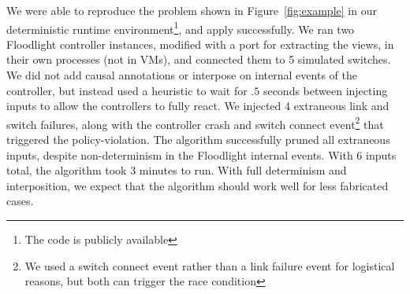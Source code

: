 
We were able to reproduce the problem shown in Figure~\ref{fig:example} in our
deterministic runtime environment\footnote{The code is publicly available}, and apply \simulator{} successfully.
We ran two Floodlight controller instances, modified with a port for
extracting the views, in their own processes (not in
VMs), and connected them to 5 simulated switches. We did not add causal
annotations or interpose on internal events of the controller, but instead used a
heuristic to wait for $.5$ seconds between injecting inputs to allow the
controllers to fully react. We injected 4 extraneous link and switch failures, along with the
controller crash and switch connect event\footnote{We used a switch connect
event rather than a link failure event for logistical reasons, but both
can trigger the race condition} that triggered the policy-violation.
The algorithm successfully pruned all extraneous
inputs, despite non-determinism in the Floodlight internal events. With 6
inputs total, the algorithm took 3 minutes to run. With full determinism and
interposition, we expect that the algorithm should work well for less
fabricated cases.
